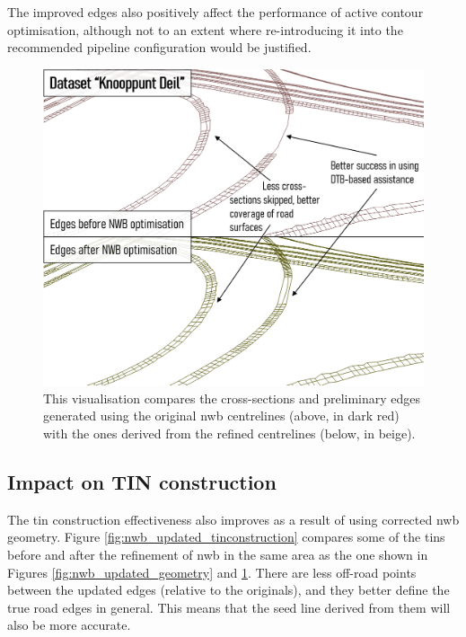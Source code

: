 The improved edges also positively affect the performance of active contour optimisation, although not to an extent where re-introducing it into the recommended pipeline configuration would be justified.

\begin{figure}
    \centering
    \includegraphics[width=0.8\linewidth]{final_report/figs/nwb_updated_edgeapproximation.png}
    \caption[Visualisation of the effects of improving NWB on preliminary edges]{This visualisation compares the cross-sections and preliminary edges generated using the original \ac{nwb} centrelines (above, in dark red) with the ones derived from the refined centrelines (below, in beige).}
    \label{fig:nwb_updated_edgeapproximation}
\end{figure}

\subsection{Impact on TIN construction}
\label{sub:nwb_updated_tinconstruction}

The \ac{tin} construction effectiveness also improves as a result of using corrected \ac{nwb} geometry. Figure \ref{fig:nwb_updated_tinconstruction} compares some of the \ac{tin}s before and after the refinement of \ac{nwb} in the same area as the one shown in Figures \ref{fig:nwb_updated_geometry} and \ref{fig:nwb_updated_edgeapproximation}. There are less off-road points between the updated edges (relative to the originals), and they better define the true road edges in general. This means that the seed line derived from them will also be more accurate.

